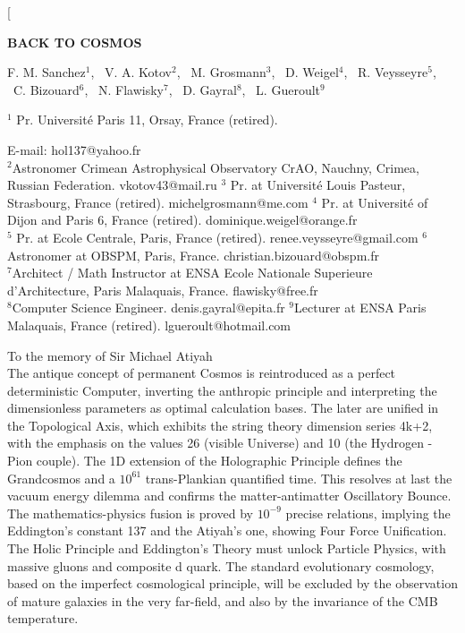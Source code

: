 \documentclass[twoside,draft]{article}
\begin{document}
\begin{sloppypar}

\renewcommand{\refname}{References}
\renewcommand{\tablename}{\small Table}
\renewcommand{\figurename}{\small Fig.}
\renewcommand{\contentsname}{Contents}


\twocolumn[%
\begin{center}
\renewcommand{\baselinestretch}{0.93}
{\Large\bfseries BACK TO COSMOS

}\par
\renewcommand{\baselinestretch}{1.0}
\bigskip
F. M. Sanchez$^1\!$, \ V. A. Kotov$^2\!$, \ M. Grosmann$^3$, \ D. Weigel$^4$, \ R. Veysseyre$^5$,\\ \ C. Bizouard$^6$, \ N. Flawisky$^7$, \ D. Gayral$^8$, \ L. Gueroult$^9$\\
{\footnotesize  $^1$ Pr. Universit\'{e} Paris 11, Orsay, France (retired).\rule{0pt}{12pt}
E-mail: hol137@yahoo.fr\\
$^2$Astronomer Crimean Astrophysical Observatory CrAO, Nauchny, Crimea, Russian Federation. vkotov43@mail.ru
$^3$ Pr. at Universit\'{e} Louis Pasteur, Strasbourg, France (retired). michelgrosmann@me.com
$^4$ Pr. at Universit\'{e} of Dijon and Paris 6, France (retired). dominique.weigel@orange.fr
\\ $^5$ Pr. at Ecole Centrale, Paris, France (retired). renee.veysseyre@gmail.com
$^6$Astronomer at OBSPM, Paris, France. christian.bizouard@obspm.fr
\\ $^7$Architect / Math Instructor at ENSA Ecole Nationale Superieure d'Architecture, Paris Malaquais, France. flawisky@free.fr
\\$^8$Computer Science Engineer. denis.gayral@epita.fr
$^9$Lecturer at ENSA Paris Malaquais, France (retired). lgueroult@hotmail.com

}\par
\medskip
{\small\parbox{11cm}{%
\hfill To the memory of Sir Michael Atiyah\\
The antique concept of permanent Cosmos is reintroduced as a perfect deterministic Computer, inverting the anthropic principle and interpreting the dimensionless parameters as optimal calculation bases. The later are unified in the Topological Axis, which exhibits the string theory dimension series 4k+2, with the emphasis on the values 26 (visible Universe) and 10 (the Hydrogen - Pion couple). The 1D extension of the Holographic Principle defines the Grandcosmos and a $10^{61}$ trans-Plankian quantified time. This resolves at last the vacuum energy dilemma and confirms the matter-antimatter Oscillatory Bounce. The mathematics-physics fusion is proved by $10^{-9}$ precise relations, implying the Eddington's constant 137 and the Atiyah's one, showing Four Force Unification. The Holic Principle and Eddington's Theory must unlock Particle Physics, with massive gluons and composite d quark. The standard evolutionary cosmology, based on the imperfect cosmological principle, will be excluded by the observation of mature galaxies in the very far-field, and also by the invariance of the CMB temperature.  

}}
\end{center}
\end{sloppypar}
\end{document}
